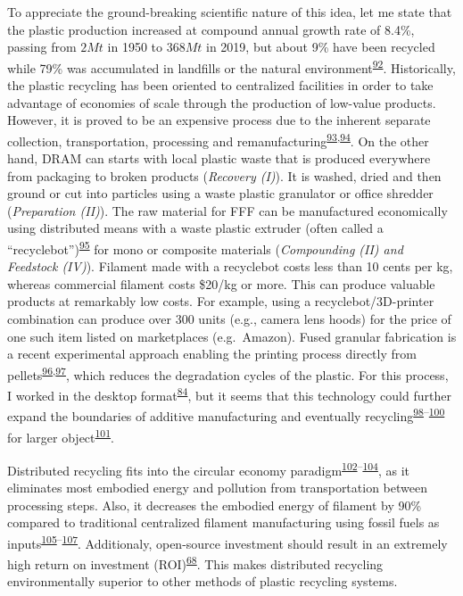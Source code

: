 \documentclass[
  12pt,
  a4paperpaper,
  onecolumn]{article}
\begin{document}
To appreciate the ground-breaking scientific nature of this idea, let me
state that the plastic production increased at compound annual growth
rate of 8.4\%, passing from \(2Mt\) in 1950 to \(368Mt\) in 2019, but
about 9\% have been recycled while 79\% was accumulated in landfills or
the natural
environment\textsuperscript{\protect\hyperlink{ref-Geyer2017}{92}}.
Historically, the plastic recycling has been oriented to centralized
facilities in order to take advantage of economies of scale through the
production of low-value products. However, it is proved to be an
expensive process due to the inherent separate collection,
transportation, processing and
remanufacturing\textsuperscript{\protect\hyperlink{ref-Hopewell2009}{93},\protect\hyperlink{ref-Singh2017b}{94}}.
On the other hand, DRAM can starts with local plastic waste that is
produced everywhere from packaging to broken products (\emph{Recovery
(I)}). It is washed, dried and then ground or cut into particles using a
waste plastic granulator or office shredder (\emph{Preparation (II)}).
The raw material for FFF can be manufactured economically using
distributed means with a waste plastic extruder (often called a
``recyclebot'')\textsuperscript{\protect\hyperlink{ref-Baechler2013}{95}}
for mono or composite materials (\emph{Compounding (II) and Feedstock
(IV)}). Filament made with a recyclebot costs less than 10 cents per kg,
whereas commercial filament costs \$20/kg or more. This can produce
valuable products at remarkably low costs. For example, using a
recyclebot/3D-printer combination can produce over 300 units (e.g.,
camera lens hoods) for the price of one such item listed on marketplaces
(e.g.~Amazon). Fused granular fabrication is a recent experimental
approach enabling the printing process directly from
pellets\textsuperscript{\protect\hyperlink{ref-JustinoNetto2021}{96},\protect\hyperlink{ref-netto2022}{97}},
which reduces the degradation cycles of the plastic. For this process, I
worked in the desktop
format\textsuperscript{\protect\hyperlink{ref-Arthur2020}{84}}, but it
seems that this technology could further expand the boundaries of
additive manufacturing and eventually
recycling\textsuperscript{\protect\hyperlink{ref-billah2021}{98}--\protect\hyperlink{ref-Byard2019}{100}}
for larger
object\textsuperscript{\protect\hyperlink{ref-petsiuk2022}{101}}.

Distributed recycling fits into the circular economy
paradigm\textsuperscript{\protect\hyperlink{ref-Zhong2018}{102}--\protect\hyperlink{ref-Despeisse2016}{104}},
as it eliminates most embodied energy and pollution from transportation
between processing steps. Also, it decreases the embodied energy of
filament by 90\% compared to traditional centralized filament
manufacturing using fossil fuels as
inputs\textsuperscript{\protect\hyperlink{ref-Kreiger2013}{105}--\protect\hyperlink{ref-Horta2017}{107}}.
Additionaly, open-source investment should result in an extremely high
return on investment
(ROI)\textsuperscript{\protect\hyperlink{ref-Pearce2020a}{68}}. This
makes distributed recycling environmentally superior to other methods of
plastic recycling systems.
\end{document}
